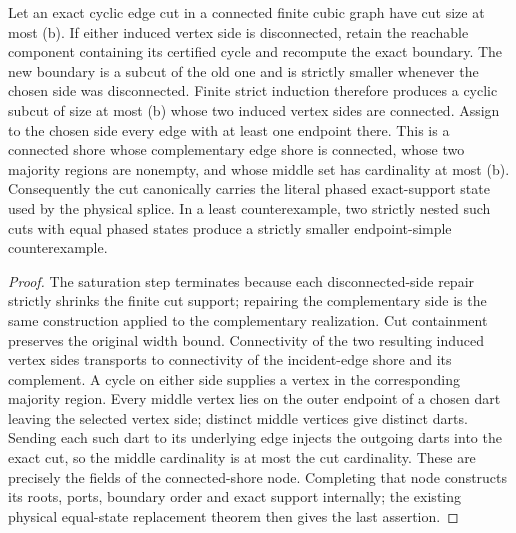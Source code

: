 \begin{lemma}
\label{lem:connected-cyclic-cut-exact-state-interface}
Let an exact cyclic edge cut in a connected finite cubic graph have cut size
at most (b).  If either induced vertex side is disconnected, retain the
reachable component containing its certified cycle and recompute the exact
boundary.  The new boundary is a subcut of the old one and is strictly
smaller whenever the chosen side was disconnected.  Finite strict induction
therefore produces a cyclic subcut of size at most (b) whose two induced
vertex sides are connected.  Assign to the chosen side every edge with at
least one endpoint there.  This is a connected shore
whose complementary edge shore is connected, whose two majority regions are
nonempty, and whose middle set has cardinality at most (b).  Consequently
the cut canonically carries the literal phased exact-support state used by
the physical splice.  In a least counterexample, two strictly nested such
cuts with equal phased states produce a strictly smaller endpoint-simple
counterexample.
\end{lemma}

\begin{proof}
The saturation step terminates because each disconnected-side repair strictly
shrinks the finite cut support; repairing the complementary side is the same
construction applied to the complementary realization.  Cut containment
preserves the original width bound.  Connectivity of the two resulting
induced vertex sides transports to connectivity of
the incident-edge shore and its complement.  A cycle on either side supplies
a vertex in the corresponding majority region.  Every middle vertex lies on
the outer endpoint of a chosen dart leaving the selected vertex side;
distinct middle vertices give distinct darts.  Sending each such dart to its
underlying edge injects the outgoing darts into the exact cut, so the middle
cardinality is at most the cut cardinality.  These are precisely the fields
of the connected-shore node.  Completing that node constructs its roots,
ports, boundary order and exact support internally; the existing physical
equal-state replacement theorem then gives the last assertion.
\end{proof}

